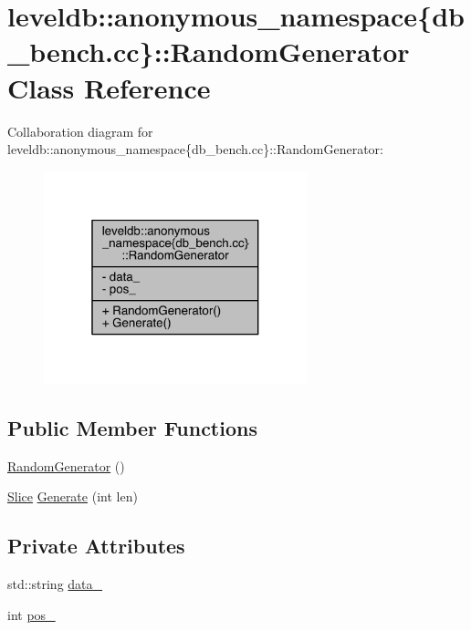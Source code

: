 \hypertarget{classleveldb_1_1anonymous__namespace_02db__bench_8cc_03_1_1_random_generator}{}\section{leveldb\+:\+:anonymous\+\_\+namespace\{db\+\_\+bench.\+cc\}\+:\+:Random\+Generator Class Reference}
\label{classleveldb_1_1anonymous__namespace_02db__bench_8cc_03_1_1_random_generator}


Collaboration diagram for leveldb\+:\+:anonymous\+\_\+namespace\{db\+\_\+bench.\+cc\}\+:\+:Random\+Generator\+:
\nopagebreak
\begin{figure}[H]
\begin{center}
\leavevmode
\includegraphics[width=217pt]{classleveldb_1_1anonymous__namespace_02db__bench_8cc_03_1_1_random_generator__coll__graph}
\end{center}
\end{figure}
\subsection*{Public Member Functions}
\begin{DoxyCompactItemize}
\item 
\hyperlink{classleveldb_1_1anonymous__namespace_02db__bench_8cc_03_1_1_random_generator_a8f67dfe5e77dfb75bdbe33b8961aaf1c}{Random\+Generator} ()
\item 
\hyperlink{classleveldb_1_1_slice}{Slice} \hyperlink{classleveldb_1_1anonymous__namespace_02db__bench_8cc_03_1_1_random_generator_a58efaa0a992e8cfa58d47a52b06c027a}{Generate} (int len)
\end{DoxyCompactItemize}
\subsection*{Private Attributes}
\begin{DoxyCompactItemize}
\item 
std\+::string \hyperlink{classleveldb_1_1anonymous__namespace_02db__bench_8cc_03_1_1_random_generator_a8b908144961b602761f9dcdb662a5411}{data\+\_\+}
\item 
int \hyperlink{classleveldb_1_1anonymous__namespace_02db__bench_8cc_03_1_1_random_generator_a41ae02395285bcf9cadfd3a4feef6b92}{pos\+\_\+}
\end{DoxyCompactItemize}


